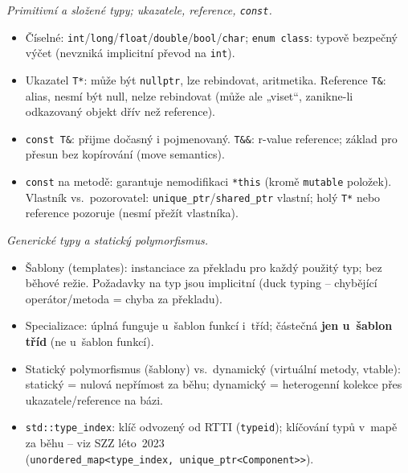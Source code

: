 \documentclass[11pt,a4paper]{article}
\newcommand{\cd}{\lstinline[style=cpp]}
\begin{document}
\begin{poznamka}
\smallskip
\emph{Primitivní a složené typy; ukazatele, reference, \texttt{const}.}
\begin{itemize}
  \item Číselné: \cd{int}/\cd{long}/\cd{float}/\cd{double}/\cd{bool}/\cd{char}; \cd{enum class}: typově bezpečný výčet (nevzniká implicitní převod na \cd{int}).
  \item Ukazatel \cd{T*}: může být \cd{nullptr}, lze rebindovat, aritmetika. Reference \cd{T&}: alias, nesmí být null, nelze rebindovat (může ale „viset``, zanikne-li odkazovaný objekt dřív než reference).
  \item \cd{const T&}: přijme dočasný i pojmenovaný. \cd{T&&}: r-value reference; základ pro přesun bez kopírování (move semantics).
  \item \cd{const} na metodě: garantuje nemodifikaci \cd{*this} (kromě \cd{mutable} položek). Vlastník vs.\ pozorovatel: \cd{unique_ptr}/\cd{shared_ptr} vlastní; holý \cd{T*} nebo reference pozoruje (nesmí přežít vlastníka).
\end{itemize}

\smallskip
\emph{Generické typy a statický polymorfismus.}
\begin{itemize}
  \item Šablony (templates): instanciace za překladu pro každý použitý typ; bez běhové režie. Požadavky na typ jsou implicitní (duck typing -- chybějící operátor/metoda = chyba za překladu).
  \item Specializace: úplná funguje u~šablon funkcí i~tříd; částečná \textbf{jen u~šablon tříd} (ne u~šablon funkcí).
  \item Statický polymorfismus (šablony) vs.\ dynamický (virtuální metody, vtable): statický = nulová nepřímost za běhu; dynamický = heterogenní kolekce přes ukazatele/reference na bázi.
  \item \cd{std::type_index}: klíč odvozený od RTTI (\cd{typeid}); klíčování typů v~mapě za běhu -- viz SZZ léto~2023 (\texttt{unordered\_map<type\_index,~unique\_ptr<Component>>}).
\end{itemize}


\end{poznamka}
\end{document}
